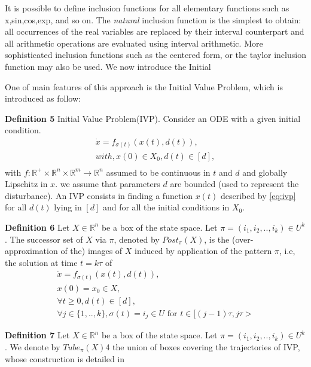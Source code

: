     It is possible to define inclusion functions for all elementary 
    functions such as x,sin,cos,exp, and so on. The \emph{natural}
    inclusion function is the simplest to obtain: all occurrences 
    of the real variables are replaced by their interval counterpart
    and all arithmetic operations are evaluated using interval 
    arithmetic. More sophisticated inclusion functions such as the 
    centered form, or the taylor inclusion function may also be used.
    We now introduce the Initial 

    One of main features of this approach is the Initial Value Problem, 
    which is introduced as follow:

    \textbf{Definition 5} Initial Value Problem(IVP). Consider an ODE 
    with a given initial condition.
    \begin{eqnarray*}            
      \label{eq:ivp}      
      \dot{x} = f_{\sigma(t)}(x(t),d(t)), \\ 
      with, x(0) \in X_0, d(t) \in [d],  \\
    \end{eqnarray*}
    with $f:\mathbb{R}^+ \times \mathbb{R}^n \times \mathbb{R}^m \rightarrow \mathbb{R}^n $
    assumed to be continuous in $t$ and $d$ and globally Lipschitz in $x$. we
    assume that parameters $d$ are bounded (used to represent the disturbance).
    An IVP consists in finding a function $x(t)$ described by \autoref{eq:ivp}
    for all $d(t)$ lying in $[d]$ and for all the initial conditions in $X_0$.
    
    \textbf{Definition 6} Let $X \in \mathbb{R}^n$ be a box of the state
    space. Let $\pi = (i_1,i_2,..,i_k) \in U^k$. The successor set of $X$
    via $\pi$, denoted by $Post_{\pi}(X)$, is the (over-approximation of the)
    images of $X$ induced by application of the pattern $\pi$, i.e, the 
    solution at time $t=k\tau$ of 
    \begin{eqnarray*}
      \dot{x} = f_{\sigma(t)}(x(t),d(t)), \\
      x(0) = x_0 \in X, \\
      \forall t \geqslant 0, d(t) \in [d], \\
      \forall j \in \lbrace 1,..,k \rbrace, \sigma(t) = i_j \in U \text{ for } t \in [(j-1)\tau,j\tau>
    \end{eqnarray*}
    
    \textbf{Definition 7} Let $X \in \mathbb{R}^n$ be a box of the state
    space. Let $\pi = (i_1,i_2,..,i_k) \in U^k$. We denote by $Tube_{\pi}(X)$4
    the union  of boxes covering the trajectories of IVP, whose construction 
    is detailed in 
    
